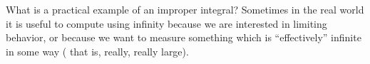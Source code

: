 \documentclass{ximera}
\begin{document}
%
%
%
%


What is a practical example of an improper integral?  Sometimes in the
real world it is useful to compute using infinity because we are
interested in limiting behavior, or because we want to measure
something which is ``effectively'' infinite in some way ( that is, really, really
large).
\end{document}
